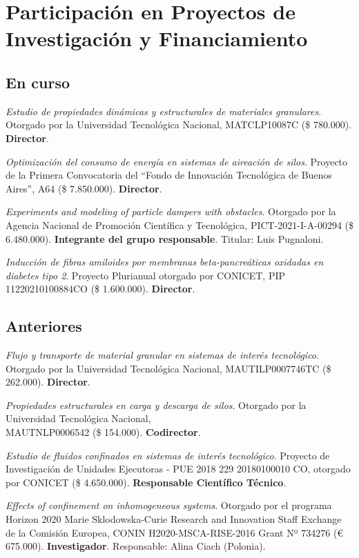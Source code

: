 \section{Participación en Proyectos de Investigación y Financiamiento}
\subsection{En curso}

 \textit{Estudio de propiedades dinámicas y estructurales de materiales granulares}. Otorgado por la Universidad Tecnológica Nacional, MATCLP10087C (\$ 780.000). \textbf{Director}.

 \textit{Optimización del consumo de energía en sistemas de aireación de silos}. Proyecto de la Primera Convocatoria del ``Fondo de Innovación Tecnológica de Buenos Aires'', A64 (\$ 7.850.000). \textbf{Director}.

 \textit{Experiments and modeling of particle dampers with obstacles}. Otorgado por la Agencia Nacional de Promoción Científica y Tecnológica, PICT-2021-I-A-00294 (\$ 6.480.000). \textbf{Integrante del grupo responsable}. Titular: Luis Pugnaloni.

 \textit{Inducción de fibras amiloides por membranas beta-pancreáticas oxidadas en diabetes tipo 2}. Proyecto Plurianual otorgado por CONICET, PIP 11220210100884CO (\$ 1.600.000). \textbf{Director}.


\subsection{Anteriores}

 \textit{Flujo y transporte de material granular en sistemas de interés tecnológico}. Otorgado por la Universidad Tecnológica Nacional, MAUTILP0007746TC (\$ 262.000). \textbf{Director}.

 \textit{Propiedades estructurales en carga y descarga de silos}. Otorgado por la Universidad Tecnológica Nacional,\\ MAUTNLP0006542 (\$ 154.000). \textbf{Codirector}.

 \textit{Estudio de fluidos confinados en sistemas de interés tecnológico}. Proyecto de Investigación de Unidades Ejecutoras - PUE 2018 229 20180100010 CO, otorgado por CONICET (\$ 4.650.000). \textbf{Responsable Científico Técnico}.

 \textit{Effects of confinement on inhomogeneous systems}. Otorgado por el programa Horizon 2020 Marie Sklodowska-Curie Research and Innovation Staff Exchange de la Comisión Europea, CONIN H2020-MSCA-RISE-2016 Grant Nº 734276 (€ 675.000). \textbf{Investigador}. Responsable: Alina Ciach (Polonia).

